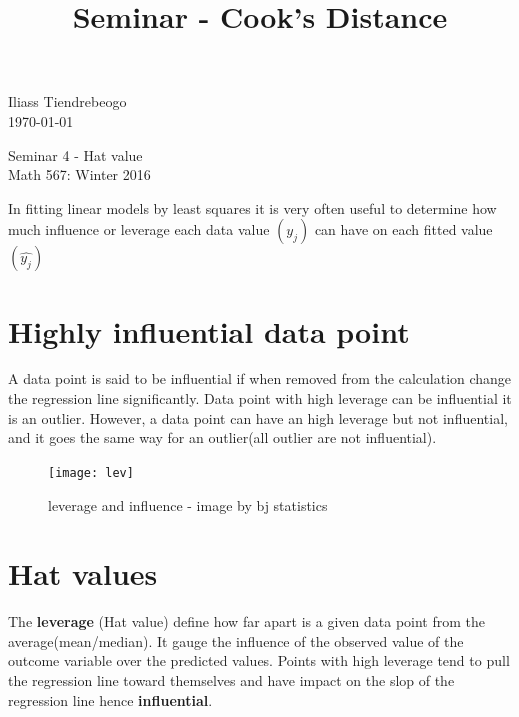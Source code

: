 \documentclass{article}[20pt]
\begin{document}
\begin{center}


\title{Seminar - Cook's Distance }
\hfill Iliass Tiendrebeogo\\

\hfill \today\\
\end{center}
\bigskip

\begin{center}
  \begin{Large}
      
    Seminar 4 - Hat value \\
    Math 567: Winter 2016 \\
       
  \end{Large}
\end{center}

\bigskip

In fitting linear models by least squares it is very often useful to determine how much influence or leverage each data value $(y_j)$ can have on each fitted value $(\hat{y_j})$
\section{Highly influential  data point}
A data point is said to be influential if when removed from the calculation change the regression line significantly. Data point with high leverage can be influential it is an outlier. However, a data point can have an high leverage but not influential, and it goes the same way for an outlier(all outlier are not influential).

\begin{figure}[h]
\begin{center}
\texttt{[image: lev]}
\end{center}
\caption{leverage and influence - {\small image by bj statistics} }

\label{fig:figure1}
\end{figure}

\section{Hat values}
The {\bf leverage} (Hat value) define how far apart is a given data point from the average(mean/median). It gauge the influence of the observed value of the outcome variable over the predicted values. Points with high leverage tend to pull the regression line toward themselves and have impact on the slop of the regression line hence {\bf influential}.
\end{document}
